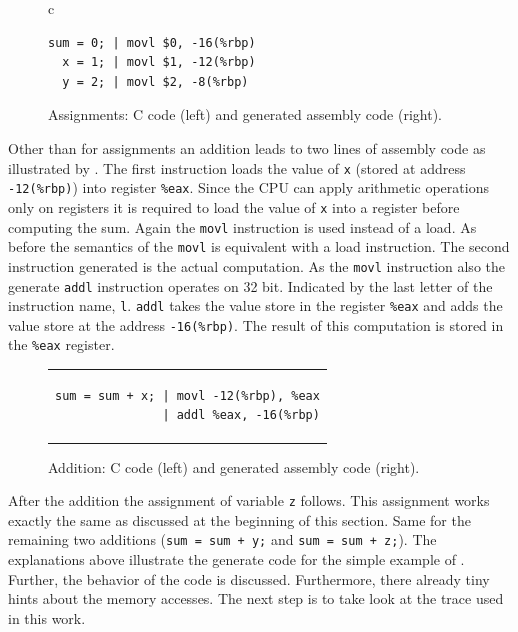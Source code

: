 \documentclass[onecolumn, openright, master, english, signatures]{dbrgrptt}
\begin{document}
\begin{figure}[!ht]
  \centering
  \begin{tabular}{c}
  \begin{lstlisting}
sum = 0; | movl $0, -16(%rbp)
  x = 1; | movl $1, -12(%rbp)
  y = 2; | movl $2, -8(%rbp)
  \end{lstlisting}
  \end{tabular}
  \caption{Assignments: C code (left) and generated assembly code (right).}
  \label{fig:mat-example-comp-assignment}
\end{figure}

Other than for assignments an addition leads to two lines of assembly code as illustrated by . The first instruction loads the value of \texttt{x} (stored at address \texttt{-12(\%rbp)}) into register \texttt{\%eax}. Since the \ac{CPU} can apply arithmetic operations only on registers it is required to load the value of \texttt{x} into a register before computing the sum. Again the \texttt{movl} instruction is used instead of a load. As before the semantics of the \texttt{movl} is equivalent with a load instruction. The second instruction generated is the actual computation. As the \texttt{movl} instruction also the generate \texttt{addl} instruction operates on 32 bit. Indicated by the last letter of the instruction name, \texttt{l}. \texttt{addl} takes the value store in the register \texttt{\%eax} and adds the value store at the address \texttt{-16(\%rbp)}. The result of this computation is stored in the \texttt{\%eax} register.

\begin{figure}[!ht]
  \centering
  \begin{tabular}{c}
  \begin{lstlisting}
sum = sum + x; | movl -12(%rbp), %eax
               | addl %eax, -16(%rbp)
  \end{lstlisting}
  \end{tabular}
  \caption{Addition: C code (left) and generated assembly code (right).}
  \label{fig:mat-example-comp-addition}
\end{figure}

After the addition the assignment of variable \texttt{z} follows. This assignment works exactly the same as discussed at the beginning of this section. Same for the remaining two additions (\texttt{sum = sum + y;} and \texttt{sum = sum + z;}). The explanations above illustrate the generate code for the simple example of . Further, the behavior of the code is discussed. Furthermore, there already tiny hints about the memory accesses. The next step is to take look at the \ac{trace} used in this work.
\end{document}
